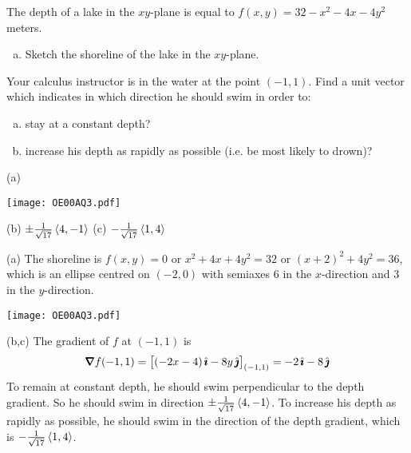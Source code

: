 \begin{question}[M200 2000A] %
The depth of a lake in the $xy$-plane is equal to 
   $f(x, y) = 32-x^2-4x-4y^2$ meters. 
\begin{enumerate}[(a)]
\item
Sketch the shoreline of the lake in the $xy$-plane. 
\end{enumerate}
Your calculus instructor is in the water at the point $(-1, 1)$. 
Find a unit vector which indicates in which direction he should swim 
in order to: 
\begin{enumerate}[(a)]
\item[(b)] 
stay at a constant depth? 
\item[(c)]
increase his depth as rapidly as possible (i.e. be most likely to drown)? 
\end{enumerate}
\end{question}

%

\begin{answer}
(a)
\begin{center}
     \texttt{[image: OE00AQ3.pdf]}
\end{center}

(b) $\pm\frac{1}{\sqrt{17}}\left< 4,-1\right>$\qquad
(c) $-\frac{1}{\sqrt{17}}\left< 1,4\right>$
\end{answer}

\begin{solution}
(a) The shoreline is $f(x,y)=0$ or $x^2+4x+4y^2=32$ or $(x+2)^2+4y^2=36$,
which is an ellipse centred on $(-2,0)$ with semiaxes $6$ in the $x$-direction
and $3$ in the $y$-direction.
\begin{center}
     \texttt{[image: OE00AQ3.pdf]}
\end{center}

(b,c) The gradient of $f$ at $(-1,1)$ is
\begin{equation*}
\vnabla f(-1,1)=\big[(-2x-4)\,\hi-8y\,\hj\big]_{(-1,1)}=-2\,\hi-8\,\hj
\end{equation*}
To remain at constant depth, he should swim perpendicular to the depth
gradient. So he should swim in direction $\pm\frac{1}{\sqrt{17}}\left< 4,-1\right>$.
To increase his depth as rapidly as possible, he should swim in the direction
of the depth gradient, which is $-\frac{1}{\sqrt{17}}\left< 1,4\right>$.
\end{solution}

